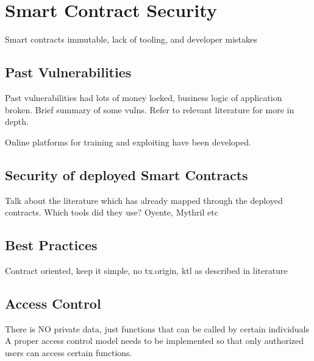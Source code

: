 \chapter{Smart Contract Security}
Smart contracts immutable, lack of tooling, and developer mistakes

\section{Past Vulnerabilities}
Past vulnerabilities had lots of money locked, business logic of application broken. Brief summary of some vulns. Refer to relevant literature for more in depth.

Online platforms for training and exploiting have been developed.

\section{Security of deployed Smart Contracts}
Talk about the literature which has already mapped through the deployed contracts. 
Which tools did they use? Oyente, Mythril etc

\section{Best Practices}
Contract oriented, keep it simple, no tx.origin, ktl as described in literature


\section{Access Control}
There is NO private data, just functions that can be called by certain individuals
A proper access control model needs to be implemented so that only authorized users can access certain functions. 
